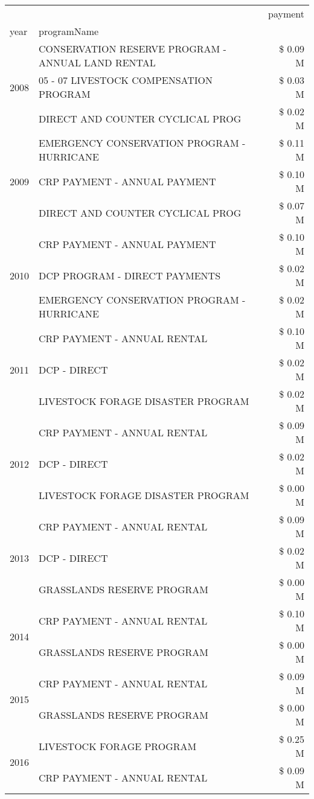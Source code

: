 \begin{tabular}{llr}
\toprule
 &  & payment \\
year & programName &  \\
\midrule
\multirow[t]{3}{*}{2008} & CONSERVATION RESERVE PROGRAM - ANNUAL LAND RENTAL & \$ 0.09 M \\
 & 05 - 07 LIVESTOCK COMPENSATION PROGRAM & \$ 0.03 M \\
 & DIRECT AND COUNTER CYCLICAL PROG & \$ 0.02 M \\
\cline{1-3}
\multirow[t]{3}{*}{2009} & EMERGENCY CONSERVATION PROGRAM - HURRICANE & \$ 0.11 M \\
 & CRP PAYMENT - ANNUAL PAYMENT & \$ 0.10 M \\
 & DIRECT AND COUNTER CYCLICAL PROG & \$ 0.07 M \\
\cline{1-3}
\multirow[t]{3}{*}{2010} & CRP PAYMENT - ANNUAL PAYMENT & \$ 0.10 M \\
 & DCP PROGRAM - DIRECT PAYMENTS & \$ 0.02 M \\
 & EMERGENCY CONSERVATION PROGRAM - HURRICANE & \$ 0.02 M \\
\cline{1-3}
\multirow[t]{3}{*}{2011} & CRP PAYMENT - ANNUAL RENTAL & \$ 0.10 M \\
 & DCP - DIRECT & \$ 0.02 M \\
 & LIVESTOCK FORAGE DISASTER PROGRAM & \$ 0.02 M \\
\cline{1-3}
\multirow[t]{3}{*}{2012} & CRP PAYMENT - ANNUAL RENTAL & \$ 0.09 M \\
 & DCP - DIRECT & \$ 0.02 M \\
 & LIVESTOCK FORAGE DISASTER PROGRAM & \$ 0.00 M \\
\cline{1-3}
\multirow[t]{3}{*}{2013} & CRP PAYMENT - ANNUAL RENTAL & \$ 0.09 M \\
 & DCP - DIRECT & \$ 0.02 M \\
 & GRASSLANDS RESERVE PROGRAM & \$ 0.00 M \\
\cline{1-3}
\multirow[t]{2}{*}{2014} & CRP PAYMENT - ANNUAL RENTAL & \$ 0.10 M \\
 & GRASSLANDS RESERVE PROGRAM & \$ 0.00 M \\
\cline{1-3}
\multirow[t]{2}{*}{2015} & CRP PAYMENT - ANNUAL RENTAL & \$ 0.09 M \\
 & GRASSLANDS RESERVE PROGRAM & \$ 0.00 M \\
\cline{1-3}
\multirow[t]{3}{*}{2016} & LIVESTOCK FORAGE PROGRAM & \$ 0.25 M \\
 & CRP PAYMENT - ANNUAL RENTAL & \$ 0.09 M \\

\end{tabular}
